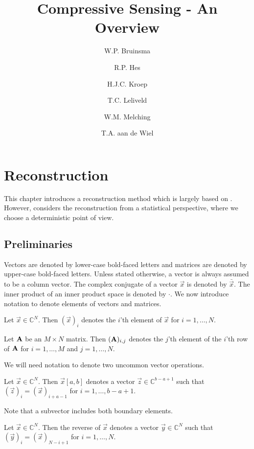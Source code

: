 \documentclass[a4paper, openany, oneside]{memoir}
\title{Compressive Sensing - An Overview}
\author{W.P. Bruinsma \and R.P. Hes \and H.J.C. Kroep \and T.C. Leliveld \and W.M. Melching \and T.A. aan de Wiel}
\begin{document}
\chapter{Reconstruction}
This chapter introduces a reconstruction method which is largely based on \cite{ariananda2012compressive}. However, \cite{ariananda2012compressive} considers the reconstruction from a statistical perspective, where we choose a deterministic point of view.

\section{Preliminaries}
Vectors are denoted by lower-case bold-faced letters and matrices are denoted by upper-case bold-faced letters. Unless stated otherwise, a vector is always assumed to be a column vector. The complex conjugate of a vector $\vec{x}$ is denoted by $\bar{\vec{x}}$. The inner product of an inner product space is denoted by $\cdot$. We now introduce notation to denote elements of vectors and matrices.

\begin{blockDefinition}
    Let $\vec{x} \in \mathbb{C}^N$. Then $(\vec{x})_i$ denotes the $i$'th element of $\vec{x}$ for $i = 1,\ldots,N$.
\end{blockDefinition}

\begin{blockDefinition}
    Let $\boldsymbol{\mathbf{A}}$ be an $M \times N$ matrix. Then $(\boldsymbol{\mathbf{A}})_{i,j}$ denotes the $j$'th element of the $i$'th row of $\boldsymbol{\mathbf{A}}$ for $i = 1,\ldots,M$ and $j=1,\ldots,N$.
\end{blockDefinition}

We will need notation to denote two uncommon vector operations.

\begin{blockDefinition}[Subvector]
    Let $\vec{x} \in \mathbb{C}^N$. Then $\vec{x}[a,b]$ denotes a vector $\vec{z} \in \mathbb{C}^{b-a+1}$ such that $(\vec{z})_i = (\vec{x})_{i+a-1}$ for $i = 1,\ldots,b-a+1$.
\end{blockDefinition}

Note that a subvector includes both boundary elements.

\begin{blockDefinition}
    Let $\vec{x} \in \mathbb{C}^N$. Then the reverse of $\vec{x}$ denotes a vector $\vec{y} \in \mathbb{C}^N$ such that $(\vec{y})_i = (\vec{x})_{N-i+1}$ for $i = 1,\ldots,N$.
\end{blockDefinition}
\end{document}
